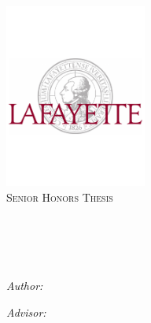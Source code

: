 \documentclass[11pt, oneside]{LaunchThesis} %
\begin{document}
\begin{titlepage}
\begin{center}

\href{http://www.lafayette.edu}{\includegraphics[width = 0.35\textwidth,trim = 0mm 80mm 0mm 80mm, clip]{LAF_logo_w_seal_color.pdf}}\\[0.2cm] 

\textsc{\Large Senior Honors Thesis}\\[0.2cm] %
\textsc{\Large  \deptname}\\[0.2cm] %

\HRule \\[0.2cm] %
{
{\huge \bfseries \ttitle}\\[-0.2cm]}%
\HRule \\[0.6 cm] %
 
\begin{minipage}{0.4\textwidth}
\begin{flushleft} \large
\emph{Author:}\\
\href{http://sites.lafayette.edu/rossmant/student-researchers/}{\authornames} %
\end{flushleft}
\end{minipage}
\begin{minipage}{0.4\textwidth}
\begin{flushright} \large
\emph{Advisor:} \\
\href{http://sites.lafayette.edu/rossmant}{\supname} %
\end{flushright}
\end{minipage}\\[.6cm]



\end{center}
\end{titlepage}
\end{document}
